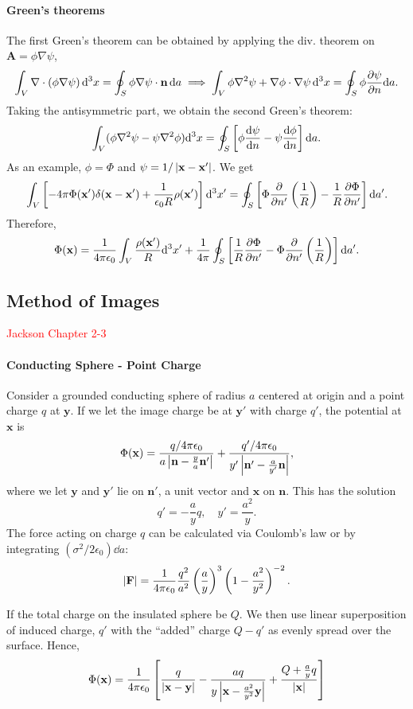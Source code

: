 \documentclass{article}
\begin{document}
\paragraph{Green's theorems}
The first Green's theorem can be obtained by applying the div. theorem on $\mathbf A=\phi\nabla\psi$, 
$$\int_V\nabla\cdot(\phi\nabla\psi)\,\dd^3x=\oint_S\phi\nabla\psi\cdot\mathbf n\,\dd a\implies\int_V\phi\nabla^2\psi+\nabla\phi\cdot\nabla\psi\,\dd^3x=\oint_S\phi \frac{\partial \psi}{\partial n}\dd a.$$
Taking the antisymmetric part, we obtain the second Green's theorem:
$$\int_V(\phi\nabla^2\psi-\psi\nabla^2\phi)\dd^3x=\oint_S\left[\phi\frac{\mathrm{d}\psi}{\mathrm{d}n}-\psi\frac{\mathrm{d}\phi}{\mathrm{d}n}\right]\dd a.$$
As an example, $\phi=\Phi$ and $\psi=1/\left\lvert\mathbf x-\mathbf x'\right\rvert$. We get
$$\int_V\left[-4\pi\Phi(\mathbf x')\delta(\mathbf x-\mathbf x')+\frac 1{\epsilon_0R}\rho(\mathbf x')\right]\dd^3x'=\oint_S\left[\Phi \frac{\partial }{\partial n'}\left(\frac 1R\right)-\frac 1R \frac{\partial \Phi}{\partial n'}\right]\dd a'.$$
Therefore,
$$\Phi(\mathbf x)=\frac 1{4\pi\epsilon_0}\int_V\frac{\rho(\mathbf x')}{R}\dd^3x'+\frac 1{4\pi}\oint_S\left[\frac 1R \frac{\partial \Phi}{\partial n'}-\Phi \frac{\partial }{\partial n'}\left(\frac 1R\right)\right]\dd a'.$$


\subsection{Method of Images}
\textcolor{red}{Jackson Chapter 2-3}

\paragraph{Conducting Sphere - Point Charge}
Consider a grounded conducting sphere of radius $a$ centered at origin and a point charge $q$ at $\mathbf y$. If we let the image charge be at $\mathbf y'$ with charge $q'$, the potential at $\mathbf x$ is 
$$\Phi(\mathbf x)=\frac{q/4\pi\epsilon_0}{a\left\lvert\mathbf n-\frac ya\mathbf n'\right\rvert}+\frac{q'/4\pi\epsilon_0}{y'\left\lvert\mathbf n'-\frac a{y'}\mathbf n\right\rvert},$$
where we let $\mathbf y$ and $\mathbf y'$ lie on $\mathbf n'$, a unit vector and $\mathbf x$ on $\mathbf n$. This has the solution
$$q'=-\frac ayq,\quad y'=\frac{a^2}y.$$
The force acting on charge $q$ can be calculated via Coulomb's law or by integrating $(\sigma^2/2\epsilon_0)\dd a$:
$$\left\lvert\mathbf F\right\rvert=\frac 1{4\pi\epsilon_0}\frac{q^2}{a^2}\left(\frac ay\right)^3\left(1-\frac{a^2}{y^2}\right)^{-2}.$$

If the total charge on the insulated sphere be $Q$. We then use linear superposition of induced charge, $q'$ with the ``added'' charge $Q-q'$ as evenly spread over the surface. Hence,
$$\Phi(\mathbf x)=\frac 1{4\pi\epsilon_0}\left[\frac q{\left\lvert\mathbf x-\mathbf y\right\rvert}-\frac{aq}{y\left\lvert\mathbf x-\frac{a^2}{y^2}\mathbf y\right\rvert}+\frac{Q+\frac ayq}{\left\lvert\mathbf x\right\rvert}\right]$$
\end{document}
